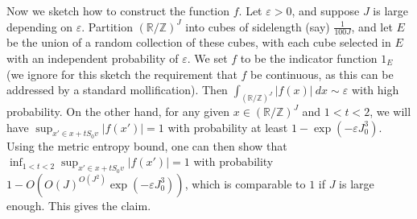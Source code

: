 \documentclass[12pt,a4paper,reqno]{amsart}
\numberwithin{equation}{section}
\theoremstyle{plain}
\theoremstyle{definition}
\newcommand\R{\mathbb{R}}
\newcommand\Z{\mathbb{Z}}
\newcommand\eps{\varepsilon}
\begin{document}
Now we sketch how to construct the function $f$.  Let $\eps>0$, and suppose $J$ is large depending on $\eps$.  Partition $(\R/\Z)^J$ into cubes of sidelength (say) $\frac{1}{100 J}$, and let $E$ be the union of a random collection of these cubes, with each cube selected in $E$ with an independent probability of $\eps$.  We set $f$ to be the indicator function $1_E$ (we ignore for this sketch the requirement that $f$ be continuous, as this can be addressed by a standard mollification).  Then $\int_{(\R/\Z)^J} |f(x)|\ dx \sim \eps$ with high probability.  On the other hand, for any given $x \in (\R/\Z)^J$ and $1 < t < 2$, we will have $\sup_{x' \in x + tS_0 v} |f(x')| = 1$ with probability at least $1 - \exp( -\eps J_0^3 )$.  Using the metric entropy bound, one can then show that $\inf_{1 < t < 2} \sup_{x' \in x + tS_0 v} |f(x')| = 1$ with probability $1 - O( O(J)^{O(J^2)} \exp( -\eps J_0^3 ) )$, which is comparable to $1$ if $J$ is large enough.  This gives the claim.
\end{document}
